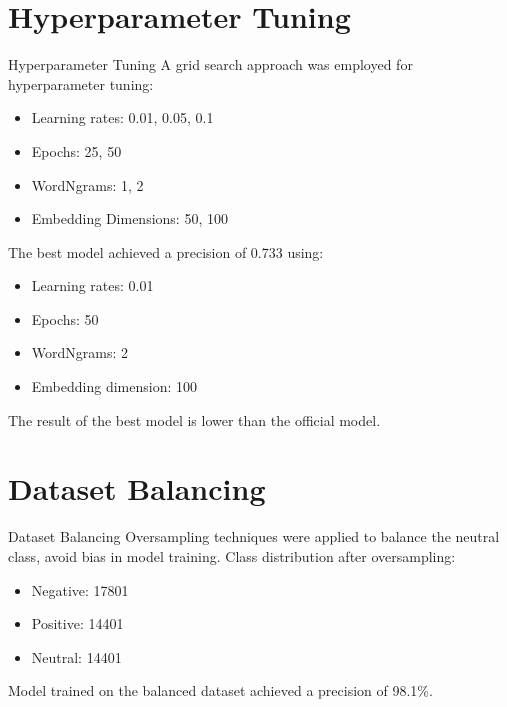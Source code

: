\documentclass{beamer}
\begin{document}
\section{Hyperparameter Tuning}
\begin{frame}{Hyperparameter Tuning}
A grid search approach was employed for hyperparameter tuning:
\begin{itemize}
    \item Learning rates: 0.01, 0.05, 0.1
    \item Epochs: 25, 50
    \item WordNgrams: 1, 2
    \item Embedding Dimensions: 50, 100
\end{itemize}
\vspace{0.5cm}
The best model achieved a precision of 0.733 using:
\begin{itemize}
    \item Learning rates: 0.01
    \item Epochs: 50
    \item WordNgrams: 2
    \item Embedding dimension: 100
\end{itemize}
The result of the best model is lower than the official model.
\end{frame}

\section{Dataset Balancing}
\begin{frame}{Dataset Balancing}
Oversampling techniques were applied to balance the neutral class, avoid bias in model training. Class distribution after oversampling:
\begin{itemize}
    \item Negative: 17801
    \item Positive: 14401
    \item Neutral: 14401
\end{itemize}
Model trained on the balanced dataset achieved a precision of 98.1\%.
\end{frame}
\end{document}
